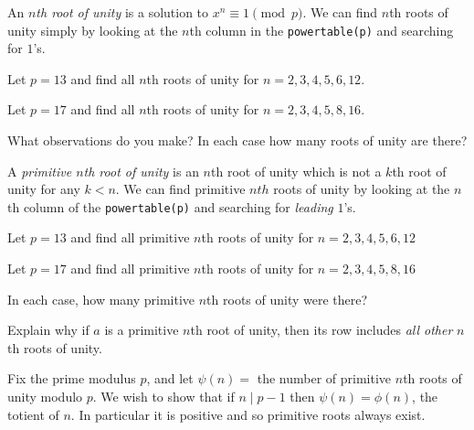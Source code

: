 \documentclass[12pt]{exam}
\begin{document}
\begin{questions}
  \question An \emph{$n$th root of unity} is a solution to $x^n\equiv1\pmod{p}$. We can find $n$th roots of unity simply by looking at the $n$th column in the \texttt{powertable(p)} and searching for $1$'s.
  \begin{parts}
    \item Let $p=13$ and find all $n$th roots of unity for $n=2,3,4,5,6,12$.
    \vspace{\fill}
    \item Let $p=17$ and find all $n$th roots of unity for $n=2,3,4,5,8,16$.
    \vspace{\fill}
    \item What observations do you make? In each case how many roots of unity are there?
    \vspace{\fill}
  \end{parts}
  \newpage
  \question A \emph{primitive $n$th root of unity} is an $n$th root of unity which is not a $k$th root of unity for any $k<n$. We can find primitive $nth$ roots of unity by looking at the $n$th column of the \texttt{powertable(p)} and searching for \emph{leading} $1$'s.
  \begin{parts}
    \item 
    \item Let $p=13$ and find all primitive $n$th roots of unity for $n=2,3,4,5,6,12$
    \item Let $p=17$ and find all primitive $n$th roots of unity for $n=2,3,4,5,8,16$
    \item In each case, how many primitive $n$th roots of unity were there?
    \item Explain why if $a$ is a primitive $n$th root of unity, then its row includes \emph{all other} $n$th roots of unity.
  \end{parts}
  \newpage
  \question Fix the prime modulus $p$, and let $\psi(n)=$ the number of primitive $n$th roots of unity modulo $p$. We wish to show that if $n\mid p-1$ then $\psi(n)=\phi(n)$, the totient of $n$. In particular it is positive and so primitive roots always exist.
  

\end{questions}
\end{document}
